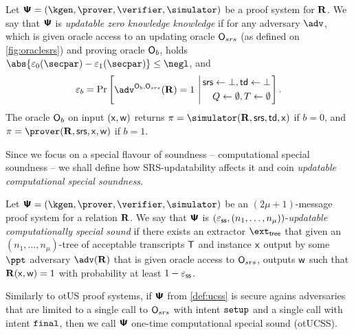 \documentclass[runningheads,11pt]{llncs}
\begin{document}
  \begin{definition}
    Let $\ps = (\kgen, \prover, \verifier, \simulator)$ be a proof system for
    $\mathbf{R}$. We say that $\bm{\mathsf{\Psi}}$ is \emph{updatable zero knowledge knowledge} if
    for any adversary $\adv$, which is given oracle access to an updating oracle
    $\mathsf{O}_{srs}$ (as defined on \cref{fig:oraclesrs}) and proving oracle
    $\mathsf{O}_b$, holds $\abs{\eps_0(\secpar) - \eps_1(\secpar)} \leq \negl$,
    and
    \[
      \eps_b = \Pr \left[
        \begin{aligned}
          \adv^{\oracleo_b, \oraclesrs}(\REL) = 1
        \end{aligned}
        \, \left| \,
          \begin{aligned}
            \srs \gets \bot, \td \gets \bot \\
            Q \gets \emptyset, T \gets \emptyset
        \end{aligned}
      \right.  \right].
  \]
  The oracle $\mathsf{O}_b$ on input $(\mathsf{x}, \mathsf{w})$ returns
  $\zkproof = \simulator(\REL, \srs, \td, \inp)$ if $b = 0$, and
  $\zkproof = \prover(\REL, \srs, \inp, \wit)$ if $b = 1$.
\end{definition}

Since we focus on a special flavour of soundness -- computational special
soundness -- we shall define how SRS-updatability affects it and coin
\emph{updatable computational special soundness}.

\begin{definition}
  \label{def:ucss}
  Let $\proofsystem = (\kgen, \prover, \verifier, \simulator)$ be an
  $(2 \mu + 1)$-message proof system for a relation $\mathbf{R}$. We say that
  $\bm{\mathsf{\Psi}}$ is $(\varepsilon_{\mathsf{ss}}, (n_1, \ldots, n_\mu))$-\emph{updatable
    computationally special sound} if there exists an extractor $\extt$ that
  given an $(n_1, \ldots, n_\mu)$-tree of acceptable transcripts $\mathsf{T}$ and
  instance $\mathsf{x}$ output by some $\ppt$ adversary $\adv(\REL)$ that is given
  oracle access to $\mathsf{O}_{srs}$, outputs $\mathsf{w}$ such that $\mathbf{R}(\mathsf{x}, \mathsf{w}) = 1$
  with probability at least $1 - \varepsilon_{\mathsf{ss}}$.
\end{definition}
Similarly to otUS proof systems, if $\bm{\mathsf{\Psi}}$ from \cref{def:ucss} is secure agains
adversaries that are limited to a single call to $\mathsf{O}_{srs}$ with intent
$\mathtt{setup}$ and a single call with intent $\mathtt{final}$, then we call $\bm{\mathsf{\Psi}}$ one-time
computational special sound (otUCSS).
\end{document}
